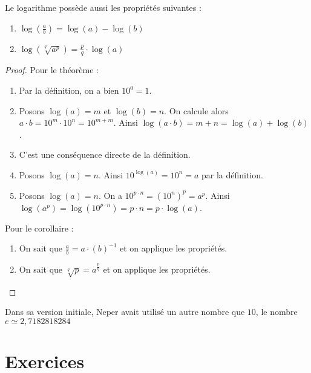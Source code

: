 \begin{corollaire}
Le logarithme possède aussi les propriétés suivantes :
\begin{enumerate}
\item $\log\left(\frac{a}{b}\right) = \log(a)- \log(b)$
\item $\log\left(\sqrt[q]{a^p}\right) = \frac{p}{q} \cdot \log(a)$
\end{enumerate}
\end{corollaire}

\begin{proof}
Pour le théorème :
\begin{enumerate}
\item Par la définition, on a bien $10^0 = 1$.
\item Posons $\log(a) = m$ et $\log(b) = n$. On calcule alors $a\cdot b = 10^m \cdot 10^n = 10^{m+m}$. Ainsi $\log(a\cdot b) = m+n = \log(a) + \log (b)$.
\item C'est une conséquence directe de la définition.
\item Posons $\log(a) = n$. Ainsi $10^{\log(a)} = 10^n = a$ par la définition.
\item Posons $\log(a) = n$. On a $10^{p \cdot n} = \left(10^{n}\right)^p = a^p$. Ainsi $\log\left(a^p\right) = \log\left(10^{p \cdot n}\right) = p \cdot n = p \cdot \log(a) $.
\end{enumerate}
Pour le corollaire :
\begin{enumerate}
\item On sait que $\frac{a}{b} = a \cdot (b)^{-1}$ et on applique les propriétés.
\item On sait que $\sqrt[q]{p} = a^{\frac{p}{q}}$ et on applique les propriétés.
\end{enumerate}
\end{proof}

\begin{remarque}

Dans sa version initiale, Neper avait utilisé un autre nombre que $10$, le nombre $e \simeq 2, 7182818284$

\end{remarque}

\section{Exercices}

